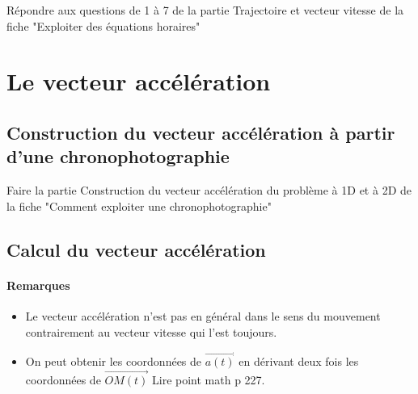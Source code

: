 

Répondre aux questions de 1 à 7 de la partie Trajectoire et vecteur vitesse de la fiche "Exploiter des équations horaires"

\section{Le vecteur accélération}
\subsection{Construction du vecteur accélération à partir d'une chronophotographie}


Faire la partie Construction du vecteur accélération du problème à 1D et à 2D de la fiche "Comment exploiter une chronophotographie"

\subsection{Calcul du vecteur accélération}

\paragraph*{Remarques} 
	\begin{itemize}
		\item Le vecteur accélération n'est pas en général dans le sens du mouvement contrairement au vecteur vitesse qui l'est toujours.
		\item On peut obtenir les coordonnées de $\overrightarrow{a(t)}$ en dérivant deux fois les coordonnées de $\overrightarrow{OM(t)}$ Lire point math p 227.
	\end{itemize}

